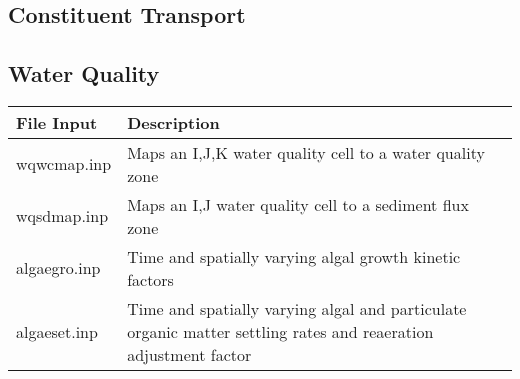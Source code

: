 \documentclass[letterpaper,10pt,english]{sphinxmanual}
\begin{document}
\begin{sphinxVerbatim}[commandchars=\\\{\}]
                              
                              
                              
    
\end{sphinxVerbatim}


\subsection{Constituent Transport}
\label{\detokenize{inputfiles/constituent:constituent-transport}}\label{\detokenize{inputfiles/constituent:constituent}}\label{\detokenize{inputfiles/constituent::doc}}

\subsection{Water Quality}
\label{\detokenize{inputfiles/waterquality:water-quality}}\label{\detokenize{inputfiles/waterquality:waterquality}}\label{\detokenize{inputfiles/waterquality::doc}}

\begin{savenotes}\sphinxattablestart
\centering
\begin{tabulary}{\linewidth}[t]{|T|T|}
\hline
\sphinxstyletheadfamily 
File Input
&\sphinxstyletheadfamily 
Description
\\
\hline
wqwcmap.inp
&
Maps an I,J,K water quality cell to a water quality zone
\\
\hline
wqsdmap.inp
&
Maps an I,J water quality cell to a sediment flux zone
\\
\hline
algaegro.inp
&
Time and spatially varying algal growth kinetic factors
\\
\hline
algaeset.inp
&
Time and spatially varying algal and particulate organic matter settling rates and reaeration adjustment factor
\\
\hline
\end{tabulary}
\par
\sphinxattableend\end{savenotes}
\end{document}
